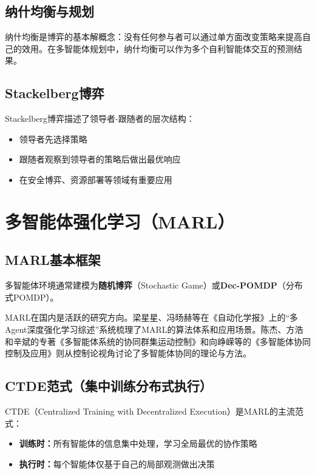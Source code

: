 \subsection{纳什均衡与规划}

纳什均衡是博弈的基本解概念：没有任何参与者可以通过单方面改变策略来提高自己的效用。在多智能体规划中，纳什均衡可以作为多个自利智能体交互的预测结果。

\subsection{Stackelberg博弈}

Stackelberg博弈描述了领导者-跟随者的层次结构：
\begin{itemize}
  \item 领导者先选择策略
  \item 跟随者观察到领导者的策略后做出最优响应
  \item 在安全博弈、资源部署等领域有重要应用
\end{itemize}

\section{多智能体强化学习（MARL） \grad}

\subsection{MARL基本框架}

多智能体环境通常建模为\textbf{随机博弈}（Stochastic Game）或\textbf{Dec-POMDP}（分布式POMDP）。

\begin{remark}
MARL在国内是活跃的研究方向。梁星星、冯旸赫等在《自动化学报》上的``多Agent深度强化学习综述''系统梳理了MARL的算法体系和应用场景。陈杰、方浩和辛斌的专著《多智能体系统的协同群集运动控制》和向峥嵘等的《多智能体协同控制及应用》则从控制论视角讨论了多智能体协同的理论与方法。
\end{remark}

\subsection{CTDE范式（集中训练分布式执行）}

\begin{keypoint}
CTDE（Centralized Training with Decentralized Execution）是MARL的主流范式：
\begin{itemize}
  \item \textbf{训练时：}所有智能体的信息集中处理，学习全局最优的协作策略
  \item \textbf{执行时：}每个智能体仅基于自己的局部观测做出决策
\end{itemize}
\end{keypoint}

